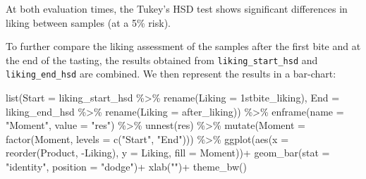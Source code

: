 \documentclass[
]{krantz}
\makeatletter
\newenvironment{Shaded}{\begin{snugshade}}{\end{snugshade}}
\newcommand{\AttributeTok}[1]{\textcolor[rgb]{0.61,0.61,0.61}{#1}}
\newcommand{\FunctionTok}[1]{\textcolor[rgb]{0,0,0}{#1}}
\newcommand{\NormalTok}[1]{#1}
\newcommand{\OtherTok}[1]{\textcolor[rgb]{0.37,0.37,0.37}{#1}}
\newcommand{\SpecialCharTok}[1]{\textcolor[rgb]{0,0,0}{#1}}
\newcommand{\StringTok}[1]{\textcolor[rgb]{0.5,0.5,0.5}{#1}}
\newenvironment{kframe}{%
\medskip{}
\setlength{\fboxsep}{.8em}
 \def\at@end@of@kframe{}%
 \ifinner\ifhmode%
  \def\at@end@of@kframe{\end{minipage}}%
  \begin{minipage}{\columnwidth}%
 \fi\fi%
 \def\FrameCommand##1{\hskip\@totalleftmargin \hskip-\fboxsep
 \colorbox{shadecolor}{##1}\hskip-\fboxsep
     \hskip-\linewidth \hskip-\@totalleftmargin \hskip\columnwidth}%
 \MakeFramed {\advance\hsize-\width
   \@totalleftmargin\z@ \linewidth\hsize
   \@setminipage}}%
 {\par\unskip\endMakeFramed%
 \at@end@of@kframe}
\renewenvironment{Shaded}{\begin{kframe}}{\end{kframe}}
\makeatother
\begin{document}
\begin{Shaded}
\end{Shaded}

At both evaluation times, the Tukey's HSD test shows significant differences in liking between samples (at a 5\% risk).

To further compare the liking assessment of the samples after the first bite and at the end of the tasting, the results obtained from \texttt{liking\_start\_hsd} and \texttt{liking\_end\_hsd} are combined. We then represent the results in a bar-chart:

\begin{Shaded}
\begin{Highlighting}[]
\FunctionTok{list}\NormalTok{(}\AttributeTok{Start =}\NormalTok{ liking\_start\_hsd }\SpecialCharTok{\%\textgreater{}\%} \FunctionTok{rename}\NormalTok{(}\AttributeTok{Liking =} \StringTok{\textasciigrave{}}\AttributeTok{1stbite\_liking}\StringTok{\textasciigrave{}}\NormalTok{),}
     \AttributeTok{End =}\NormalTok{ liking\_end\_hsd }\SpecialCharTok{\%\textgreater{}\%} \FunctionTok{rename}\NormalTok{(}\AttributeTok{Liking =} \StringTok{\textasciigrave{}}\AttributeTok{after\_liking}\StringTok{\textasciigrave{}}\NormalTok{)) }\SpecialCharTok{\%\textgreater{}\%}
  \FunctionTok{enframe}\NormalTok{(}\AttributeTok{name =} \StringTok{"Moment"}\NormalTok{, }\AttributeTok{value =} \StringTok{"res"}\NormalTok{) }\SpecialCharTok{\%\textgreater{}\%}
  \FunctionTok{unnest}\NormalTok{(res) }\SpecialCharTok{\%\textgreater{}\%}
  \FunctionTok{mutate}\NormalTok{(}\AttributeTok{Moment =} \FunctionTok{factor}\NormalTok{(Moment, }\AttributeTok{levels =} \FunctionTok{c}\NormalTok{(}\StringTok{"Start"}\NormalTok{, }\StringTok{"End"}\NormalTok{))) }\SpecialCharTok{\%\textgreater{}\%}
  \FunctionTok{ggplot}\NormalTok{(}\FunctionTok{aes}\NormalTok{(}\AttributeTok{x =} \FunctionTok{reorder}\NormalTok{(Product, }\SpecialCharTok{{-}}\NormalTok{Liking), }\AttributeTok{y =}\NormalTok{ Liking, }\AttributeTok{fill =}\NormalTok{ Moment))}\SpecialCharTok{+}
  \FunctionTok{geom\_bar}\NormalTok{(}\AttributeTok{stat =} \StringTok{"identity"}\NormalTok{, }\AttributeTok{position =} \StringTok{"dodge"}\NormalTok{)}\SpecialCharTok{+}
  \FunctionTok{xlab}\NormalTok{(}\StringTok{""}\NormalTok{)}\SpecialCharTok{+}
  \FunctionTok{theme\_bw}\NormalTok{()}
\end{Highlighting}
\end{Shaded}
\end{document}
